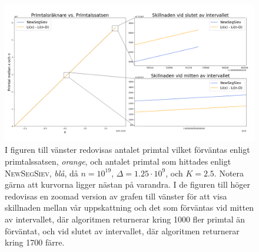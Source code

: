 \begin{figure}[H]
    \centering
    \includegraphics[width = \textwidth]{coen/Images/Primes.png}
    \caption{I figuren till vänster redovisas antalet primtal vilket förväntas enligt primtalssatsen, \textit{orange}, och antalet primtal som hittades enligt \textsc{NewSegSiev}, \textit{blå}, då \(n = 10^{19}\), \(\Delta = 1.25\cdot10^{9}\), och \(K = 2.5\). 
    Notera gärna att kurvorna ligger nästan på varandra. 
    I de figuren till höger redovisas en zoomad version av grafen till vänster för att visa skillnaden mellan vår uppskattning och det som förväntas vid mitten av intervallet, där algoritmen returnerar kring 1000 fler primtal än förväntat, och vid slutet av intervallet, där algoritmen returnerar kring 1700 färre.}
    \label{fig:res.prime}
\end{figure}

